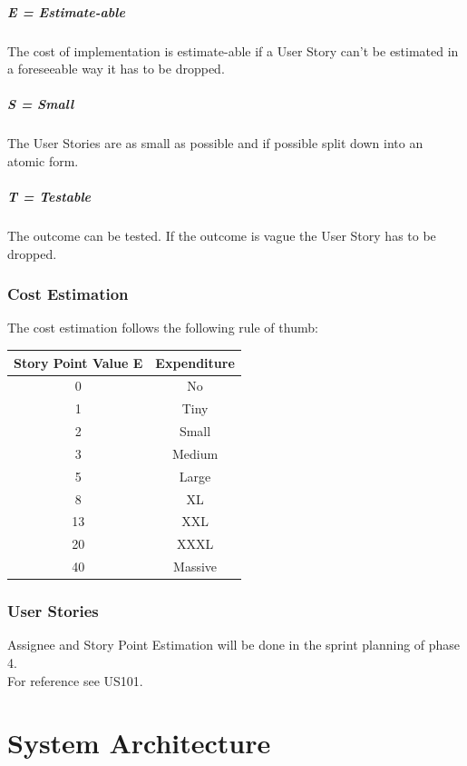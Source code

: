 \documentclass{scrreprt}
\begin{document}
\paragraph{E = Estimate-able} The cost of implementation is estimate-able if a User Story can't be estimated in a foreseeable way it has to be dropped.
\paragraph{S = Small} The User Stories are as small as possible and if possible split down into an atomic form.
\paragraph{T = Testable} The outcome can be tested. If the outcome is vague the User Story has to be dropped.  \\
 \subsection{Cost Estimation}
The cost estimation follows the following rule of thumb: \\
\begin{tabular}{c|c}
	Story Point Value E & Expenditure \\ 
		\hline
		0 & No 	\\
		1 & Tiny 	\\
		2 & Small	\\
		3 & Medium	\\
		5 & Large	\\
		8 & XL	\\
		13 & XXL	\\
		20 & XXXL	\\
		40 & Massive	\\
\end{tabular}
\subsection{User Stories}
Assignee and Story Point Estimation will be done in the sprint planning of phase 4. \\
For reference see US101.
	
	\label{userstory}

\chapter{System Architecture}
\end{document}
